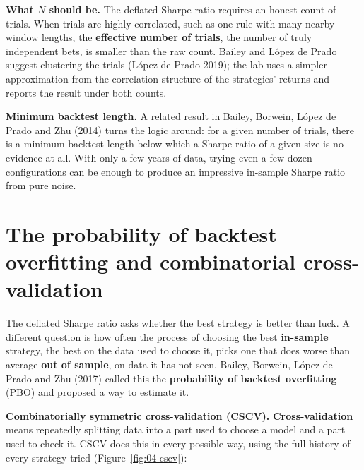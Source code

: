 \textbf{What $N$ should be.} The deflated Sharpe ratio requires an honest count of trials. When trials are highly correlated, such as one rule with many nearby window lengths, the \textbf{effective number of trials}, the number of truly independent bets, is smaller than the raw count. Bailey and L\'opez de Prado suggest clustering the trials (L\'opez de Prado 2019); the lab uses a simpler approximation from the correlation structure of the strategies' returns and reports the result under both counts.

\textbf{Minimum backtest length.} A related result in Bailey, Borwein, L\'opez de Prado and Zhu (2014) turns the logic around: for a given number of trials, there is a minimum backtest length below which a Sharpe ratio of a given size is no evidence at all. With only a few years of data, trying even a few dozen configurations can be enough to produce an impressive in-sample Sharpe ratio from pure noise.

\section{The probability of backtest overfitting and combinatorial cross-validation}
\label{sec:04-pbo}

The deflated Sharpe ratio asks whether the best strategy is better than luck. A different question is how often the process of choosing the best \textbf{in-sample} strategy, the best on the data used to choose it, picks one that does worse than average \textbf{out of sample}, on data it has not seen. Bailey, Borwein, L\'opez de Prado and Zhu (2017) called this the \textbf{probability of backtest overfitting} (PBO) and proposed a way to estimate it.

\textbf{Combinatorially symmetric cross-validation (CSCV).} \textbf{Cross-validation} means repeatedly splitting data into a part used to choose a model and a part used to check it. CSCV does this in every possible way, using the full history of every strategy tried (Figure~\ref{fig:04-cscv}):

